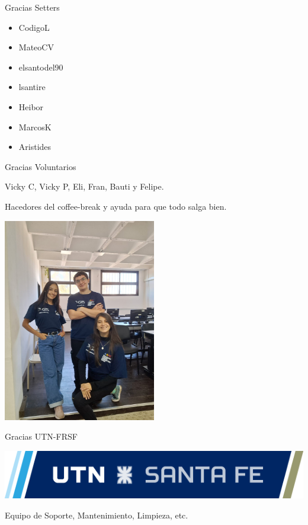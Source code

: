 \documentclass{beamer}
\begin{document}
\begin{frame}{Gracias Setters}
    \begin{itemize}
        \item {\color{purple} CodigoL}
        \item {\color{orange} MateoCV}
        \item {\color{orange} elsantodel90}
        \item {\color{orange} lsantire}
        \item {\color{orange} Heibor}
        \item {\color{orange} MarcosK}
        \item {\color{cyan} Aristides}
    \end{itemize}
\end{frame}

\begin{frame}{Gracias Voluntarios}
    \begin{center}
        Vicky C, Vicky P, Eli, Fran, Bauti y Felipe.

        \vspace{0.5cm}
        Hacedores del coffee-break y ayuda para que todo salga bien.

        \vspace{0.7cm}
        \includegraphics[width=0.5\textwidth,keepaspectratio,trim=0cm 10cm 0cm 10cm,clip]{img/voluntarios.jpeg}
    \end{center}
\end{frame}

\begin{frame}{Gracias UTN-FRSF}
    \begin{center}
        \includegraphics[width=1.05\textwidth,keepaspectratio]{logos/utn_santafe.png}

        \vspace{0.5cm}
        Equipo de Soporte, Mantenimiento, Limpieza, etc.
    \end{center}
\end{frame}
\end{document}
